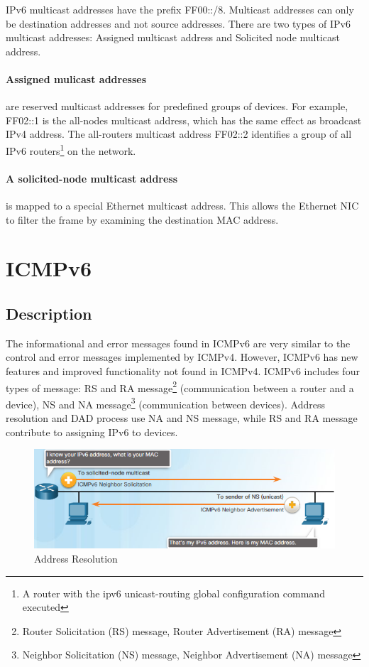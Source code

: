 IPv6 multicast addresses have the prefix FF00::/8. Multicast addresses can only be destination addresses and not source addresses. There are two types of IPv6 multicast addresses: Assigned multicast address and Solicited node multicast address.

\paragraph{Assigned mulicast addresses} are reserved multicast addresses for predefined groups of devices. For example, FF02::1 is the all-nodes multicast address, which has the same effect as broadcast IPv4 address. The all-routers multicast address FF02::2 identifies a group of all IPv6 routers\footnote{A router with the ipv6 unicast-routing global configuration command executed} on the network.

\paragraph{A solicited-node multicast address} is mapped to a special Ethernet multicast address. This allows the Ethernet NIC to filter the frame by examining the destination MAC address.

\section{ICMPv6}

\subsection{Description}

The informational and error messages found in ICMPv6 are very similar to the control and error messages implemented by ICMPv4. However, ICMPv6 has new features and improved functionality not found in ICMPv4. ICMPv6 includes four types of message: RS and RA message\footnote{Router Solicitation (RS) message, Router Advertisement (RA) message} (communication between a router and a device), NS and NA message\footnote{Neighbor Solicitation (NS) message, Neighbor Advertisement (NA) message} (communication between devices). Address resolution and DAD process use NA and NS message, while RS and RA message contribute to assigning IPv6 to devices.\\

\begin{figure}[hbtp]
\caption{Address Resolution}\label{AddressResolution}
\centering
\includegraphics[scale=1]{pictures/AddressResolution.PNG}
\end{figure}


